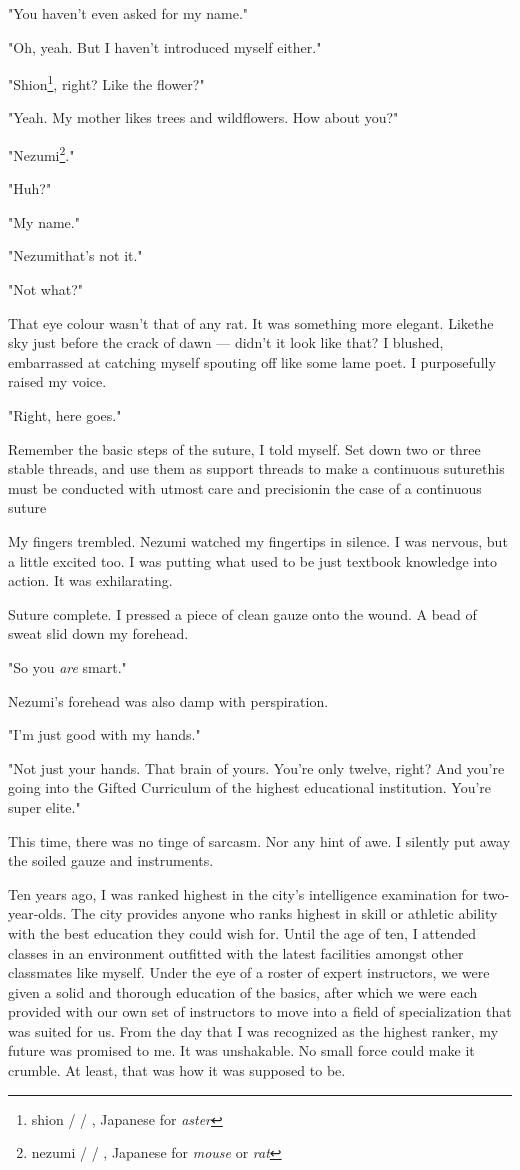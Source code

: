 "You haven't even asked for my name."

"Oh, yeah. But I haven't introduced myself either."

"Shion\footnote{shion /  / , Japanese for \emph{aster}}, right? Like the flower?"

"Yeah. My mother likes trees and wildflowers. How about you?"

"Nezumi\footnote{nezumi /  / , Japanese for \emph{mouse} or \emph{rat}}."

"Huh?"

"My name."

"Nezumi\el that's not it."

"Not what?"

That eye colour wasn't that of any rat. It was something more elegant.
Like\el the sky just before the crack of dawn --- didn't it look like
that? I blushed, embarrassed at catching myself spouting off like some
lame poet. I purposefully raised my voice.

"Right, here goes."

Remember the basic steps of the suture, I told myself. Set down two or
three stable threads, and use them as support threads to make a
continuous suture\el this must be conducted with utmost care and
precision\el in the case of a continuous suture\el 

My fingers trembled. Nezumi watched my fingertips in silence. I was
nervous, but a little excited too. I was putting what used to be just
textbook knowledge into action. It was exhilarating.

Suture complete. I pressed a piece of clean gauze onto the wound. A bead
of sweat slid down my forehead.

"So you \emph{are} smart."

Nezumi's forehead was also damp with perspiration.

"I'm just good with my hands."

"Not just your hands. That brain of yours. You're only twelve, right?
And you're going into the Gifted Curriculum of the highest educational
institution. You're super elite."

This time, there was no tinge of sarcasm. Nor any hint of awe. I
silently put away the soiled gauze and instruments.

Ten years ago, I was ranked highest in the city's intelligence
examination for two-year-olds. The city provides anyone who ranks
highest in skill or athletic ability with the best education they could
wish for. Until the age of ten, I attended classes in an environment
outfitted with the latest facilities amongst other classmates like
myself. Under the eye of a roster of expert instructors, we were given a
solid and thorough education of the basics, after which we were each
provided with our own set of instructors to move into a field of
specialization that was suited for us. From the day that I was
recognized as the highest ranker, my future was promised to me. It was
unshakable. No small force could make it crumble. At least, that was how
it was supposed to be.

